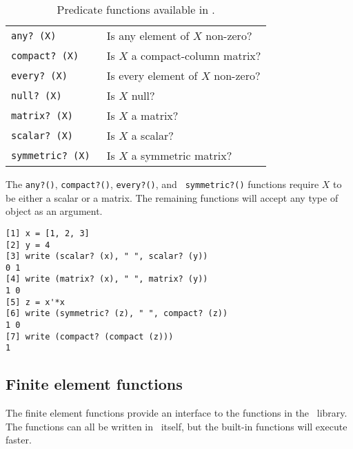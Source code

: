 \begin{table}[htbp]
\begin{center}
\begin{tabular}{ll}
\tt any?\ (X)	    & Is any element of $X$ non-zero?	\\
\tt compact?\ (X)   & Is $X$ a compact-column matrix?	\\
\tt every?\ (X)	    & Is every element of $X$ non-zero?	\\
\tt null?\ (X)	    & Is $X$ null?			\\
\tt matrix?\ (X)    & Is $X$ a matrix?			\\
\tt scalar?\ (X)    & Is $X$ a scalar?			\\
\tt symmetric?\ (X) & Is $X$ a symmetric matrix?	\\
\end{tabular}
\caption{Predicate functions available in \burlap.}
\label{burlap.predicate.table}
\end{center}
\end{table}

The {\tt any?()}, {\tt compact?()}, {\tt every?()}, and {\tt
symmetric?()} functions require $X$ to be either a scalar or a matrix.
The remaining functions will accept any type of object as an argument.

\begin{screen}
\begin{verbatim}
[1] x = [1, 2, 3]
[2] y = 4      
[3] write (scalar? (x), " ", scalar? (y))
0 1
[4] write (matrix? (x), " ", matrix? (y))
1 0
[5] z = x'*x   
[6] write (symmetric? (z), " ", compact? (z))
1 0
[7] write (compact? (compact (z)))
1
\end{verbatim}
\end{screen}


\subsection{Finite element functions}
\label{burlap.fe.functions}

The finite element functions provide an interface to the functions in
the \felt\ library.  The functions can all be written in \burlap\
itself, but the built-in functions will execute faster.

